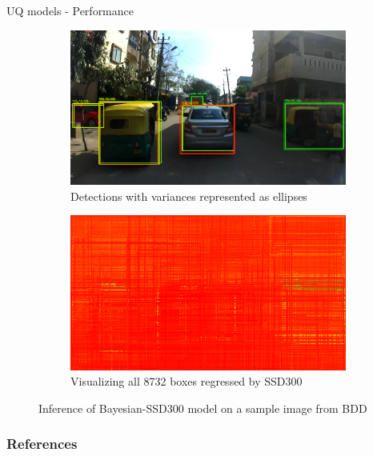 \documentclass[10pt, aspectratio=169]{beamer}
\begin{document}
\begin{frame}[allowframebreaks]{UQ models - Performance}
       \begin{figure}[H]
        \captionsetup[table]{skip=0pt}
           \centering
           \begin{subfigure}[t]{0.495\textwidth}
               \centering
               \includegraphics[width=\textwidth]{images/det_images/idd_bnn_variances_1.png}
               \caption{Detections with variances represented as ellipses}
           \end{subfigure}
           \begin{subfigure}[t]{0.495\textwidth}
               \centering
               \includegraphics[width=\textwidth]{images/det_images/all_bnn_idd_1.png}
               \caption{Visualizing all 8732 boxes regressed by SSD300}
           \end{subfigure}
           \caption{Inference of Bayesian-SSD300 model on a sample image from BDD}
       \end{figure}

\end{frame}



\begin{frame}[allowframebreaks]
    \frametitle{References}
    
    {\small
}
\end{frame}
\end{document}
